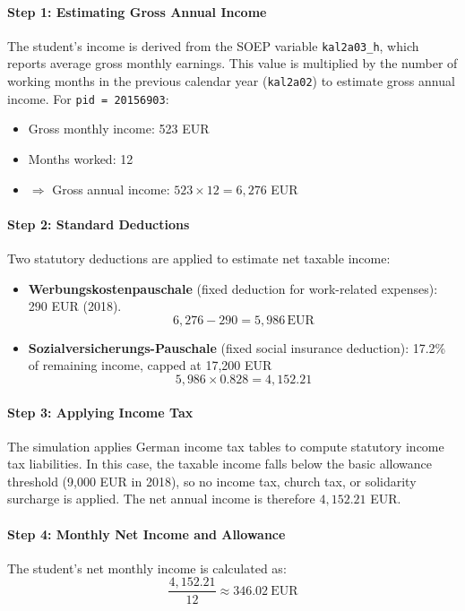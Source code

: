 \paragraph{Step 1: Estimating Gross Annual Income}  
The student’s income is derived from the SOEP variable \texttt{kal2a03\_h}, which reports average gross monthly earnings. This value is multiplied by the number of working months in the previous calendar year (\texttt{kal2a02}) to estimate gross annual income.  
For \texttt{pid = 20156903}:
\begin{itemize}
    \item Gross monthly income: 523 EUR
    \item Months worked: 12
    \item $\Rightarrow$ Gross annual income: $523 \times 12 = 6{,}276$ EUR
\end{itemize}

\paragraph{Step 2: Standard Deductions}  
Two statutory deductions are applied to estimate net taxable income:
\begin{itemize}
    \item \textbf{Werbungskostenpauschale} (fixed deduction for work-related expenses): 290 EUR (2018). 
        \[ 6,276 - 290 = 5,986 \, \text{EUR}  \]
    \item \textbf{Sozialversicherungs-Pauschale} (fixed social insurance deduction): 17.2\% of remaining income, capped at 17,200 EUR
        \[ 5{,}986 \times 0.828 = 4{,}152.21 \]
        
\end{itemize}

\paragraph{Step 3: Applying Income Tax}
The simulation applies German income tax tables to compute statutory income tax liabilities. 
In this case, the taxable income falls below the basic allowance threshold (9,000 EUR in 2018), so no income tax, church tax, or solidarity surcharge is applied.
The net annual income is therefore \( 4,152.21 \) EUR.

\paragraph{Step 4: Monthly Net Income and Allowance}
The student’s net monthly income is calculated as:
\[
\frac{4{,}152.21}{12} \approx 346.02~\text{EUR}
\]

